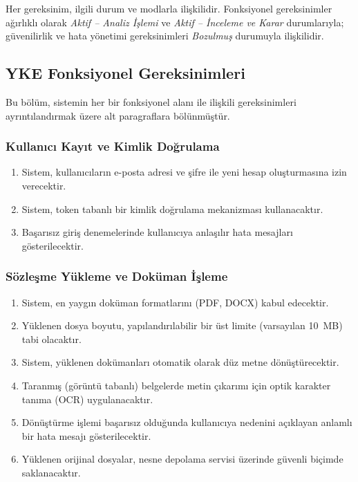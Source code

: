 \documentclass[12pt, a4paper]{article}
\begin{document}
Her gereksinim, ilgili durum ve modlarla ilişkilidir. Fonksiyonel gereksinimler ağırlıklı olarak \textit{Aktif -- Analiz İşlemi} ve \textit{Aktif -- İnceleme ve Karar} durumlarıyla; güvenilirlik ve hata yönetimi gereksinimleri \textit{Bozulmuş} durumuyla ilişkilidir.

\subsection{YKE Fonksiyonel Gereksinimleri}

Bu bölüm, sistemin her bir fonksiyonel alanı ile ilişkili gereksinimleri ayrıntılandırmak üzere alt paragraflara bölünmüştür.

\subsubsection{Kullanıcı Kayıt ve Kimlik Doğrulama}
\begin{enumerate}[leftmargin=2cm]
    \item Sistem, kullanıcıların e-posta adresi ve şifre ile yeni hesap oluşturmasına izin verecektir.
    \item Sistem, token tabanlı bir kimlik doğrulama mekanizması kullanacaktır.
    \item Başarısız giriş denemelerinde kullanıcıya anlaşılır hata mesajları gösterilecektir.
\end{enumerate}

\subsubsection{Sözleşme Yükleme ve Doküman İşleme}
\begin{enumerate}[leftmargin=2cm]
    \item Sistem, en yaygın doküman formatlarını (PDF, DOCX) kabul edecektir.
    \item Yüklenen dosya boyutu, yapılandırılabilir bir üst limite (varsayılan 10~MB) tabi olacaktır.
    \item Sistem, yüklenen dokümanları otomatik olarak düz metne dönüştürecektir.
    \item Taranmış (görüntü tabanlı) belgelerde metin çıkarımı için optik karakter tanıma (OCR) uygulanacaktır.
    \item Dönüştürme işlemi başarısız olduğunda kullanıcıya nedenini açıklayan anlamlı bir hata mesajı gösterilecektir.
    \item Yüklenen orijinal dosyalar, nesne depolama servisi üzerinde güvenli biçimde saklanacaktır.
\end{enumerate}
\end{document}
